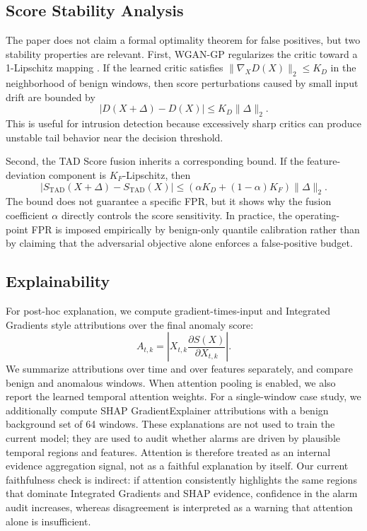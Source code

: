 \documentclass[conference]{IEEEtran}
\newcommand{\tad}{TAD Score}
\begin{document}
\subsection{Score Stability Analysis}
The paper does not claim a formal optimality theorem for false positives, but two stability properties are relevant. First, WGAN-GP regularizes the critic toward a 1-Lipschitz mapping \cite{gulrajani2017wgangp}. If the learned critic satisfies $\|\nabla_X D(X)\|_2 \leq K_D$ in the neighborhood of benign windows, then score perturbations caused by small input drift are bounded by
\begin{equation}
  |D(X+\Delta)-D(X)| \leq K_D \|\Delta\|_2.
\end{equation}
This is useful for intrusion detection because excessively sharp critics can produce unstable tail behavior near the decision threshold.

Second, the \tad{} fusion inherits a corresponding bound. If the feature-deviation component is $K_F$-Lipschitz, then
\begin{equation}
  |S_{\mathrm{TAD}}(X+\Delta)-S_{\mathrm{TAD}}(X)|
  \leq \left(\alpha K_D + (1-\alpha)K_F\right)\|\Delta\|_2.
\end{equation}
The bound does not guarantee a specific FPR, but it shows why the fusion coefficient $\alpha$ directly controls the score sensitivity. In practice, the operating-point FPR is imposed empirically by benign-only quantile calibration rather than by claiming that the adversarial objective alone enforces a false-positive budget.

\subsection{Explainability}
For post-hoc explanation, we compute gradient-times-input and Integrated Gradients style attributions over the final anomaly score:
\begin{equation}
  A_{t,k} = \left| X_{t,k} \frac{\partial S(X)}{\partial X_{t,k}} \right|.
\end{equation}
We summarize attributions over time and over features separately, and compare benign and anomalous windows. When attention pooling is enabled, we also report the learned temporal attention weights. For a single-window case study, we additionally compute SHAP GradientExplainer attributions with a benign background set of 64 windows. These explanations are not used to train the current model; they are used to audit whether alarms are driven by plausible temporal regions and features. Attention is therefore treated as an internal evidence aggregation signal, not as a faithful explanation by itself. Our current faithfulness check is indirect: if attention consistently highlights the same regions that dominate Integrated Gradients and SHAP evidence, confidence in the alarm audit increases, whereas disagreement is interpreted as a warning that attention alone is insufficient.
\end{document}
